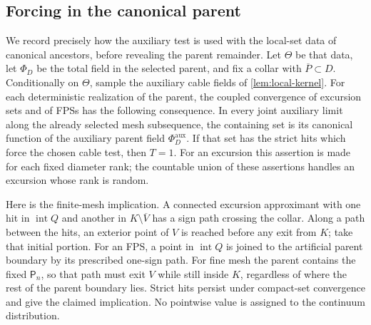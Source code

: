 \subsection{Forcing in the canonical parent}

We record precisely how the auxiliary test is used with the local-set
data of canonical ancestors, before revealing the parent remainder.
Let \(\Theta\) be that data, let \(\Phi_D\) be the
total field in the selected parent, and fix a collar with
\(\overline P\subset D\). Conditionally on \(\Theta\), sample the
auxiliary cable fields of \cref{lem:local-kernel}. For each deterministic
realization of the parent, the coupled convergence of excursion sets
\cite[Theorems~3 and~28]{ALS2023} and of FPSs
\cite[Proposition~4.7]{ALS2018} has the following consequence. In
every joint auxiliary limit along the already selected mesh subsequence,
the containing set is its canonical function of the auxiliary parent
field \(\Phi_D^{\mathrm{aux}}\). If
that set has the strict hits which force the chosen cable test, then
\(T=1\). For an excursion this assertion is made for each fixed
diameter rank; the countable union of these assertions handles an
excursion whose rank is random.

Here is the finite-mesh implication. A connected excursion approximant
with one hit in \(\operatorname{int}Q\) and another in
\(K\setminus\overline V\) has a sign path crossing the collar.
Along a path between the hits, an exterior point of \(V\) is reached
before any exit from \(K\); take that initial portion. For an FPS,
a point in \(\operatorname{int}Q\) is joined to the artificial parent
boundary by its prescribed one-sign path. For fine mesh the parent
contains the fixed \(\mathsf P_n\), so that path must exit \(V\) while
still inside \(K\), regardless of where the rest of the parent boundary
lies. Strict hits persist under compact-set convergence and give the
claimed implication. No pointwise value is assigned to the continuum
distribution.

